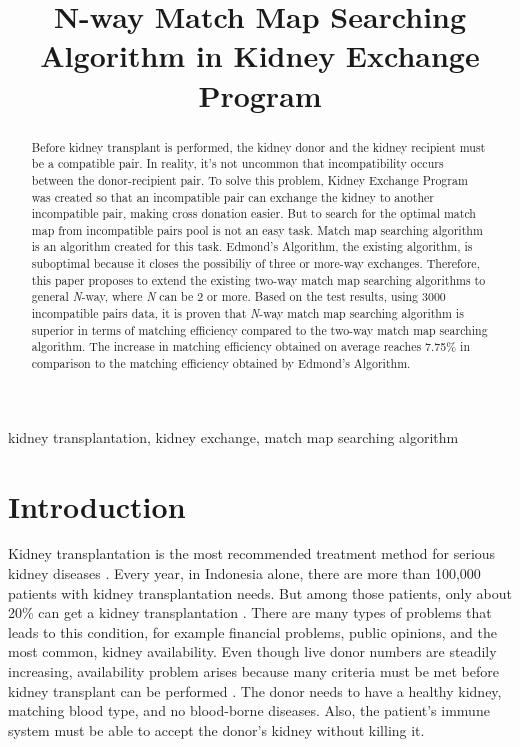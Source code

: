 \documentclass[conference]{IEEEtran}
\begin{document}
\title{N-way Match Map Searching Algorithm in Kidney Exchange Program}

\author{
\and
{}
\and
{}
}

\maketitle

\begin{abstract}
Before kidney transplant is performed, the kidney donor and the kidney recipient must
be a compatible pair. In reality, it's not uncommon that incompatibility occurs between the donor-recipient pair.
To solve this problem, Kidney Exchange Program was created so that an incompatible pair can exchange the kidney
to another incompatible pair, making cross donation easier. But to search for the optimal match map from incompatible
pairs pool is not an easy task. Match map searching algorithm is an algorithm created for this task. Edmond's
Algorithm, the existing algorithm, is suboptimal because it closes the possibiliy of three or more-way exchanges.
Therefore, this paper proposes to extend the existing two-way match map searching algorithms to general \textit{N}-way,
where \textit{N} can be 2 or more. Based on the test results, using 3000 incompatible pairs data, it is
proven that \textit{N}-way match map searching algorithm is superior in terms of matching efficiency compared to
the two-way match map searching algorithm. The increase in matching efficiency obtained on average reaches 7.75\%
in comparison to the matching efficiency obtained by Edmond's Algorithm. 
\end{abstract}

\begin{IEEEkeywords}
kidney transplantation, kidney exchange, match map searching algorithm
\end{IEEEkeywords}

\section{Introduction}
Kidney transplantation is the most recommended treatment method for serious kidney diseases \cite{roth2005}.
Every year, in Indonesia alone, there are more than 100,000 patients with kidney transplantation needs. But among
those patients, only about 20\% can get a kidney transplantation \cite{wiradarma}. There are many types
of problems that leads to this condition, for example financial problems, public opinions, and the most
common, kidney availability.
Even though live donor numbers are steadily increasing\cite{roth2006}, availability problem arises because many criteria must
be met before kidney transplant can be performed \cite{wiradarma}. The donor needs to have a healthy kidney,
matching blood type, and no blood-borne diseases. Also, the patient's immune system must be able to accept
the donor's kidney without killing it.
\end{document}
